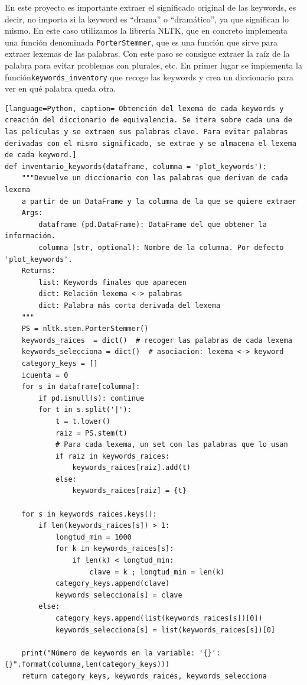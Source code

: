 En este proyecto es importante extraer el significado original de las keywords, es decir, no importa si la keyword es ``drama'' o ``dramático'', ya que significan lo mismo. En este caso utilizamos la librería NLTK, que en concreto implementa una función denominada \texttt{PorterStemmer}\cite{porter}, que es una función que sirve para extraer lexemas de las palabras. Con este paso se consigue extraer la raíz de la palabra para evitar problemas con plurales, etc. En primer lugar se implementa la función\texttt{keywords\_inventory} que recoge las keywords y crea un diccionario para ver en qué palabra queda otra.

\begin{lstlisting}[language=Python, caption= Obtención del lexema de cada keywords y creación del diccionario de equivalencia. Se itera sobre cada una de las películas y se extraen sus palabras clave. Para evitar palabras derivadas con el mismo significado, se extrae y se almacena el lexema de cada keyword.]
def inventario_keywords(dataframe, columna = 'plot_keywords'):
    """Devuelve un diccionario con las palabras que derivan de cada lexema
    a partir de un DataFrame y la columna de la que se quiere extraer
    Args:
        dataframe (pd.DataFrame): DataFrame del que obtener la información.
        columna (str, optional): Nombre de la columna. Por defecto 'plot_keywords'.
    Returns:
        list: Keywords finales que aparecen
        dict: Relación lexema <-> palabras
        dict: Palabra más corta derivada del lexema
    """
    PS = nltk.stem.PorterStemmer()
    keywords_raices  = dict()  # recoger las palabras de cada lexema
    keywords_selecciona = dict()  # asociacion: lexema <-> keyword
    category_keys = []
    icuenta = 0
    for s in dataframe[columna]:
        if pd.isnull(s): continue
        for t in s.split('|'):
            t = t.lower()
            raiz = PS.stem(t)
            # Para cada lexema, un set con las palabras que lo usan
            if raiz in keywords_raices:                
                keywords_raices[raiz].add(t)
            else:
                keywords_raices[raiz] = {t}
    
    for s in keywords_raices.keys():
        if len(keywords_raices[s]) > 1:  
            longtud_min = 1000
            for k in keywords_raices[s]:
                if len(k) < longtud_min:
                    clave = k ; longtud_min = len(k)            
            category_keys.append(clave)
            keywords_selecciona[s] = clave
        else:
            category_keys.append(list(keywords_raices[s])[0])
            keywords_selecciona[s] = list(keywords_raices[s])[0]
                   
    print("Número de keywords en la variable: '{}': {}".format(columna,len(category_keys)))
    return category_keys, keywords_raices, keywords_selecciona
\end{lstlisting}

